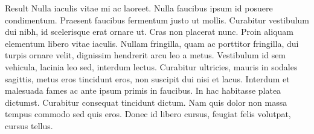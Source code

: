 Result Nulla iaculis vitae mi ac laoreet. Nulla faucibus ipsum id posuere condimentum. Praesent faucibus fermentum justo ut mollis. Curabitur vestibulum dui nibh, id scelerisque erat ornare ut. Cras non placerat nunc. Proin aliquam elementum libero vitae iaculis. Nullam fringilla, quam ac porttitor fringilla, dui turpis ornare velit, dignissim hendrerit arcu leo a metus. Vestibulum id sem vehicula, lacinia leo sed, interdum lectus. Curabitur ultricies, mauris in sodales sagittis, metus eros tincidunt eros, non suscipit dui nisi et lacus. Interdum et malesuada fames ac ante ipsum primis in faucibus. In hac habitasse platea dictumst. Curabitur consequat tincidunt dictum. Nam quis dolor non massa tempus commodo sed quis eros. Donec id libero cursus, feugiat felis volutpat, cursus tellus.
